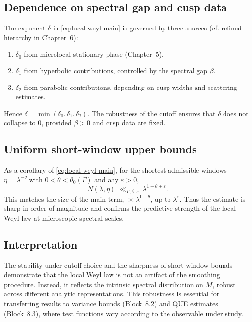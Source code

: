 \subsection{Dependence on spectral gap and cusp data}

The exponent $\delta$ in \eqref{eq:local-weyl-main} is governed by three sources (cf. refined hierarchy in Chapter~6):
\begin{enumerate}
  \item $\delta_0$ from microlocal stationary phase (Chapter~5).
  \item $\delta_1$ from hyperbolic contributions, controlled by the spectral gap $\beta$.
  \item $\delta_2$ from parabolic contributions, depending on cusp widths and scattering estimates.
\end{enumerate}
Hence $\delta=\min(\delta_0,\delta_1,\delta_2)$.  
The robustness of the cutoff ensures that $\delta$ does not collapse to $0$, provided $\beta>0$ and cusp data are fixed.

\subsection{Uniform short-window upper bounds}

As a corollary of \eqref{eq:local-weyl-main}, for the shortest admissible windows $\eta=\lambda^{-\theta}$ with $0<\theta<\theta_0(\Gamma)$ and any $\varepsilon>0$,
\[
N(\lambda,\eta)\;\ll_{\Gamma,\beta,\varepsilon}\; \lambda^{1-\theta+\varepsilon}.
\]
This matches the size of the main term, $\asymp \lambda^{1-\theta}$, up to $\lambda^\varepsilon$.  
Thus the estimate is sharp in order of magnitude and confirms the predictive strength of the local Weyl law at microscopic spectral scales.

\subsection{Interpretation}

The stability under cutoff choice and the sharpness of short-window bounds demonstrate that the local Weyl law is not an artifact of the smoothing procedure.  
Instead, it reflects the intrinsic spectral distribution on $M$, robust across different analytic representations.  
This robustness is essential for transferring results to variance bounds (Block~8.2) and QUE estimates (Block~8.3), where test functions vary according to the observable under study.


